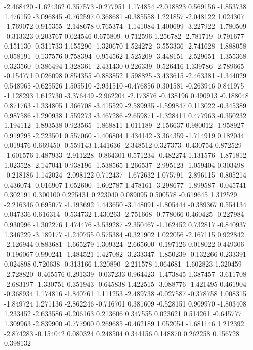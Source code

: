 -2.468420
-1.624362
0.357573
-0.277951
1.174854
-2.018823
0.569156
-1.853738
1.476159
-3.096845
-0.762597
0.368681
-0.385558
1.221857
-2.048122
1.024307
-1.769072
0.915355
-2.148678
0.765374
-1.141084
1.400699
-3.227922
-1.780509
-0.313323
0.203767
0.024546
0.675809
-0.712596
1.256782
-2.781719
-0.791677
0.151130
-0.311733
1.155290
-1.320670
1.524272
-3.553336
-2.741628
-1.888058
0.058191
-0.137576
0.758394
-0.954562
1.525209
-3.448151
-2.529651
-1.355368
0.323560
-0.386494
1.328361
-2.431430
0.226339
-0.526416
1.339786
-2.789665
-0.154771
0.026098
0.854355
-0.883852
1.598825
-3.433615
-2.463381
-1.344029
0.548965
-0.625526
1.505510
-2.931510
-0.476856
0.301581
-0.263946
0.841975
-1.128293
1.612730
-3.376449
-2.962204
-2.173876
-0.438196
0.490913
-0.188048
0.871763
-1.334805
1.366708
-3.415529
-2.589935
-1.599847
0.113022
-0.345389
0.987586
-1.290938
1.559273
-3.467286
-2.659871
-1.328411
0.477963
-0.350232
1.194112
-1.893538
0.923565
-1.868811
1.011189
-2.156637
0.980012
-1.958927
0.919295
-2.223501
0.557060
-1.406804
1.434142
-3.364359
-1.714919
0.182044
0.019476
0.669450
-0.559143
1.441636
-2.348512
0.327373
-0.430754
0.872529
-1.601576
1.487933
-2.911228
-0.864301
0.571234
-0.482274
1.131576
-1.871812
1.023528
-2.147041
0.938196
-1.538565
1.266537
-2.995123
-1.059404
0.303498
-0.218186
1.142024
-2.098122
0.712437
-1.672632
1.075791
-2.896115
-0.805214
0.436074
-0.016907
1.052600
-1.602787
1.478161
-3.298677
-1.899587
-0.045741
0.302191
0.300100
0.225431
0.223040
0.089095
0.500578
-0.619645
1.312529
-2.216346
0.695077
-1.193692
1.443650
-3.148091
-1.805444
-0.389367
0.554134
0.047336
0.616314
-0.534732
1.430263
-2.751668
-0.778066
0.460425
-0.227984
0.930996
-1.302276
1.474476
-3.539287
-2.350467
-1.162452
0.732817
-0.840937
1.346229
-3.189177
-1.240755
0.575384
-0.321902
1.022056
-2.167115
0.922842
-2.126944
0.883681
-1.665279
1.309324
-2.665600
-0.197126
0.018022
0.449306
-0.196067
0.990241
-1.484521
1.427082
-3.233347
-1.850239
-0.132266
0.233391
0.024898
0.720638
-0.313166
1.320890
-2.211578
1.064681
-1.602823
1.320459
-2.728820
-0.465576
0.291339
-0.037233
0.964423
-1.473845
1.387457
-3.611708
-2.683197
-1.330751
0.351943
-0.645838
1.422515
-3.088776
-1.421495
0.461904
-0.368934
1.174816
-1.840761
1.111253
-2.489738
-0.027587
-0.378758
1.008315
-1.849724
1.271136
-2.862246
-0.716701
0.381609
-0.528151
0.909970
-1.803408
1.233452
-2.633586
-0.206163
0.213606
0.347555
0.023621
0.514261
-0.645777
1.309963
-2.839900
-0.777900
0.269685
-0.462189
1.052054
-1.681146
1.212392
-2.874283
-0.154042
0.080324
0.248504
0.344156
0.148870
0.262258
0.156728
0.398132
